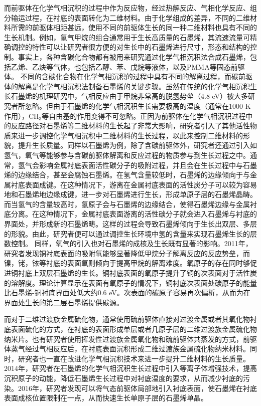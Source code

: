而前驱体在化学气相沉积的过程中作为反应物，经过热解反应、气相化学反应、组分输运过程，在衬底的表面转化为二维材料。由于化学组成的差异，不同的二维材料所需的前驱体相距甚远，使用不同的前驱体生长的同一种二维材料也具有不同的生长机制。例如，氢气甲烷的组合通常用于生长高质量的石墨烯，其流速流量可精确调控的特性可以让研究者很方便的对生长中的石墨烯进行尺寸，形态和结构的控制。事实上，各种含碳化合物都有被用来研究通过化学气相沉积法合成石墨烯，包括乙烯、乙炔等气体，也包括乙醇、苯、戊烷等液体，以及PMMA等固态前驱体。%
不同的含碳化合物在化学气相沉积的过程中具有不同的解离过程，而碳前驱体的解离是化学气相沉积法制备石墨烯的关键步骤。虽然在传统的化学气相沉积生长石墨烯的机理研究中，气相反应由于甲烷非常高的脱氢势垒（4.8 eV）被大多研究者所忽略。但由于石墨烯的化学气相沉积生长需要极高的温度（通常在1000 K作用），CH$_3$等自由基的作用变得不可忽略。正因为前驱体在化学气相沉积过程中的反应路径对石墨烯等二维材料的生长起了非常大影响，研究者引入了其他活性物质来进一步调控化学气相沉积中二维材料的生长过程，以此来控制二维材料的形貌，提升生长质量。同样以石墨烯为例，除了含碳前驱体外，研究者还通过引入如氢气，氧气等能够参与含碳前驱体解离和反应过程的物质参与到生长过程之中。通常，氢气会影响金属衬底表面活性碳分子的吸附过程，并且会在生长过程中与石墨烯的边缘结合，甚至会腐蚀石墨烯。在氢气含量较低时，石墨烯的边缘倾向于与金属衬底表面成键。在这种情况下，游离在金属衬底表面的活性炭分子可以较为容易地和石墨烯地边缘成键，进一步对石墨烯进行生长，形成单原子层的石墨烯晶畴。而当氢气的含量较高时，氢原子会与石墨烯的边缘结合，使得石墨烯边缘与金属衬底分离。在这种情况下，金属衬底表面游离的活性碳分子就会进入石墨烯与衬底的界面处，并形成新的石墨烯畴。这样的过程会导致石墨烯倾向于生长出双层、多层的形貌。由此，研究者便可以通过调控生长环境中氢的含量来实现石墨烯生长的层数控制。%
同样，氧气的引入也对石墨烯的成核及生长既有显著的影响。2011年，研究者发现铜衬底表面的吸附氧能够显著降低甲烷分子解离反应的反应势垒，而镍，铑，铱等衬底的表面氧则倾向于提高甲烷的解离难度。氧原子的存在同时够促进铜衬底上双层石墨烯的生长。铜衬底表面的氧原子提升了铜的次表面对于活性炭的溶解度。理论计算显示在表面有氧原子的情况下，铜衬底次表面处碳原子的能量比石墨烯-铜衬底界面处低大约0.6 eV。次表面的碳原子容易再次偏析，从而为在界面处生长的第二层石墨烯提供碳源。

而对于二维过渡族金属硫化物，通常使用硫前驱体直接对过渡金属或者其氧化物衬底表面硫化的方式，在衬底的表面形成单层或者几原子层的二维过渡族金属硫化物纳米片。也有研究者使用挥发性过渡族金属氧化物和硫前驱体共蒸发的方式，前驱体蒸气经过气相反应后，在衬底表面沉积形成二维过渡族金属硫化物纳米材料。同时，研究者也一直在改进化学气相沉积技术来进一步提升二维材料的生长质量。2014年，研究者在石墨烯的化学气相沉积生长过程中引入等离子体增强技术，提高沉积原子的动能，降低石墨烯生长过程中对衬底温度的要求，从而减少衬底的污染。2016年，研究者发现可以将气态前驱体局部地引入衬底表面，使石墨烯在衬底表面成核位置限制在一点，从而快速生长单原子层的石墨烯单晶。

